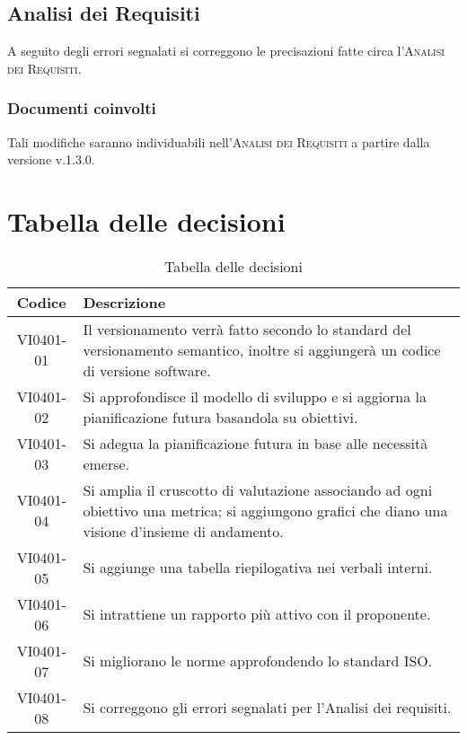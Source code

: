 \documentclass{article}
\begin{document}
\subsection{Analisi dei Requisiti}
\label{itm:8}

A seguito degli errori segnalati si correggono le precisazioni fatte circa l'\textsc{Analisi dei Requisiti}.
\subsubsection*{Documenti coinvolti}
Tali modifiche saranno individuabili nell'\textsc{Analisi dei Requisiti} a partire dalla versione v.1.3.0.

\newpage
\section{Tabella delle decisioni}%
\label{sub:decisioni}

\begin{table}[!ht]
	\centering
	\begin{tabular}{|c|p{13cm}|}
		\hline
		\rowcolor{lightgray}
		\textbf{Codice} & \textbf{Descrizione} \\ 
		\hline
			VI0401-01 & Il versionamento verrà fatto secondo lo standard del versionamento semantico, inoltre si aggiungerà un codice di versione software. \\
			VI0401-02 & Si approfondisce il modello di sviluppo e si aggiorna la pianificazione futura basandola su obiettivi. \\
            VI0401-03 & Si adegua la pianificazione futura in base alle necessità emerse. \\
            VI0401-04 & Si amplia il cruscotto di valutazione associando ad ogni obiettivo una metrica; si aggiungono grafici che diano una visione d'insieme di andamento. \\
            VI0401-05 & Si aggiunge una tabella riepilogativa nei verbali interni. \\
            VI0401-06 & Si intrattiene un rapporto più attivo con il proponente. \\
            VI0401-07 & Si migliorano le norme approfondendo lo standard ISO. \\
            VI0401-08 & Si correggono gli errori segnalati per l'Analisi dei requisiti.  \\
		\hline
	\end{tabular}
	\caption{Tabella delle decisioni}
\end{table}
\end{document}
